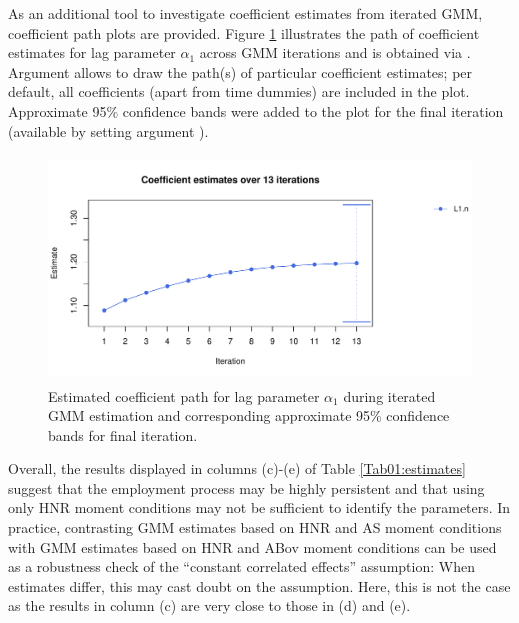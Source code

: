 As an additional tool to investigate coefficient estimates from iterated GMM, coefficient path plots \citep[compare][Figure 1]{HansenLee2020} are provided. Figure \ref{fig:pdynmc_coef_path} illustrates the path of coefficient estimates for lag parameter $\alpha_1$ across GMM iterations and is obtained via . Argument  allows to draw the path(s) of particular coefficient estimates; per default, all coefficients (apart from time dummies) are included in the plot. Approximate 95\% confidence bands were added to the plot for the final iteration (available by setting argument ).
\begin{figure}[ht]
  \centering
  \includegraphics[width = 12cm, height = 6cm]{plot_pdynmc_coef_path.pdf}
  \caption{Estimated coefficient path for lag parameter $\alpha_1$ during iterated GMM estimation and corresponding approximate 95\% confidence bands for final iteration.}\label{fig:pdynmc_coef_path}
\end{figure}


Overall, the results displayed in columns (c)-(e) of Table \ref{Tab01:estimates} suggest that the employment process may be highly persistent and that using only HNR moment conditions may not be sufficient to identify the parameters.
In practice, contrasting GMM estimates based on HNR and AS moment conditions with GMM estimates based on HNR and ABov moment conditions can be used as a robustness check of the ``constant correlated effects'' assumption: When estimates differ, this may cast doubt on the assumption. Here, this is not the case as the results in column (c) are very close to those in (d) and (e).















